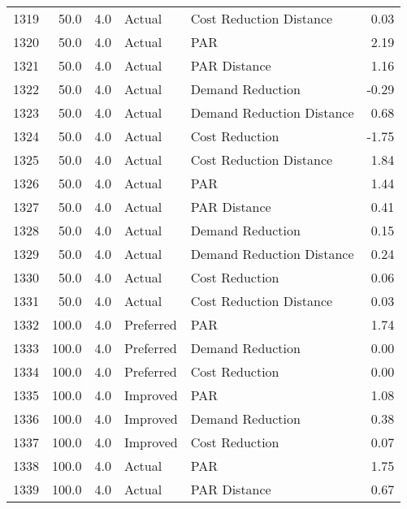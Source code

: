 \begin{longtable}{lrrllr}
1319 &         50.0 &     4.0 &         Actual &    Cost Reduction Distance &   0.03 \\
1320 &         50.0 &     4.0 &         Actual &                        PAR &   2.19 \\
1321 &         50.0 &     4.0 &         Actual &               PAR Distance &   1.16 \\
1322 &         50.0 &     4.0 &         Actual &           Demand Reduction &  -0.29 \\
1323 &         50.0 &     4.0 &         Actual &  Demand Reduction Distance &   0.68 \\
1324 &         50.0 &     4.0 &         Actual &             Cost Reduction &  -1.75 \\
1325 &         50.0 &     4.0 &         Actual &    Cost Reduction Distance &   1.84 \\
1326 &         50.0 &     4.0 &         Actual &                        PAR &   1.44 \\
1327 &         50.0 &     4.0 &         Actual &               PAR Distance &   0.41 \\
1328 &         50.0 &     4.0 &         Actual &           Demand Reduction &   0.15 \\
1329 &         50.0 &     4.0 &         Actual &  Demand Reduction Distance &   0.24 \\
1330 &         50.0 &     4.0 &         Actual &             Cost Reduction &   0.06 \\
1331 &         50.0 &     4.0 &         Actual &    Cost Reduction Distance &   0.03 \\
1332 &        100.0 &     4.0 &      Preferred &                        PAR &   1.74 \\
1333 &        100.0 &     4.0 &      Preferred &           Demand Reduction &   0.00 \\
1334 &        100.0 &     4.0 &      Preferred &             Cost Reduction &   0.00 \\
1335 &        100.0 &     4.0 &       Improved &                        PAR &   1.08 \\
1336 &        100.0 &     4.0 &       Improved &           Demand Reduction &   0.38 \\
1337 &        100.0 &     4.0 &       Improved &             Cost Reduction &   0.07 \\
1338 &        100.0 &     4.0 &         Actual &                        PAR &   1.75 \\
1339 &        100.0 &     4.0 &         Actual &               PAR Distance &   0.67 \\

\end{longtable}
